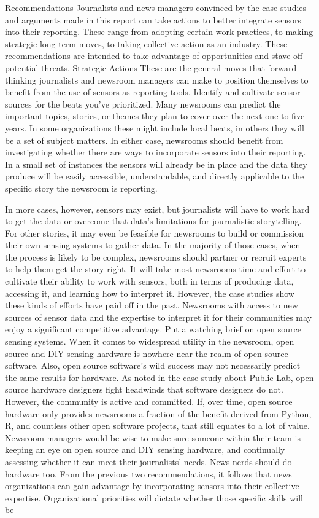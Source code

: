 \begin{itemize}
Recommendations
Journalists and news managers convinced by the case studies and arguments
made in this report can take actions to better integrate sensors into
their reporting. These range from adopting certain work practices, to making
strategic long-term moves, to taking collective action as an industry.
These recommendations are intended to take advantage of opportunities
and stave off potential threats.
Strategic Actions
These are the general moves that forward-thinking journalists and newsroom
managers can make to position themselves to benefit from the use of
sensors as reporting tools.
Identify and cultivate sensor sources for the beats
you've prioritized.
Many newsrooms can predict the important topics, stories, or themes they
plan to cover over the next one to five years. In some organizations these
might include local beats, in others they will be a set of subject matters. In
either case, newsrooms should benefit from investigating whether there are
ways to incorporate sensors into their reporting. In a small set of instances
the sensors will already be in place and the data they produce will be easily
accessible, understandable, and directly applicable to the specific story the
newsroom is reporting.

In more cases, however, sensors may exist, but journalists will have to work
hard to get the data or overcome that data's limitations for journalistic storytelling.
For other stories, it may even be feasible for newsrooms to build
or commission their own sensing systems to gather data. In the majority of
those cases, when the process is likely to be complex, newsrooms should
partner or recruit experts to help them get the story right.
It will take most newsrooms time and effort to cultivate their ability to work
with sensors, both in terms of producing data, accessing it, and learning
how to interpret it. However, the case studies show these kinds of efforts
have paid off in the past. Newsrooms with access to new sources of sensor
data and the expertise to interpret it for their communities may enjoy a significant
competitive advantage.
Put a watching brief on open source sensing systems.
When it comes to widespread utility in the newsroom, open source and
DIY sensing hardware is nowhere near the realm of open source software.
Also, open source software's wild success may not necessarily predict the
same results for hardware. As noted in the case study about Public Lab,
open source hardware designers fight headwinds that software designers
do not. However, the community is active and committed. If, over time,
open source hardware only provides newsrooms a fraction of the benefit
derived from Python, R, and countless other open software projects, that
still equates to a lot of value. Newsroom managers would be wise to make
sure someone within their team is keeping an eye on open source and DIY
sensing hardware, and continually assessing whether it can meet their
journalists' needs.
News nerds should do hardware too.
From the previous two recommendations, it follows that news organizations
can gain advantage by incorporating sensors into their collective expertise.
Organizational priorities will dictate whether those specific skills will be


\end{itemize}
